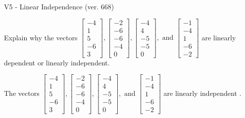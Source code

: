 \begin{exercise}
  \begin{exerciseTitle}V5 - Linear Independence (ver. 668)\end{exerciseTitle}
  \begin{exerciseStatement}
    Explain why the vectors \(\left[\begin{array}{r}
-4 \\
1 \\
5 \\
-6 \\
3
\end{array}\right] , \left[\begin{array}{r}
-2 \\
-6 \\
-6 \\
-4 \\
0
\end{array}\right] , \left[\begin{array}{r}
-4 \\
4 \\
-5 \\
-5 \\
0
\end{array}\right] , \text{ and } \left[\begin{array}{r}
-1 \\
-4 \\
1 \\
-6 \\
-2
\end{array}\right]\) are linearly dependent or linearly independent.	


  \end{exerciseStatement}
  \begin{exerciseAnswer}
   The vectors \(\left[\begin{array}{r}
-4 \\
1 \\
5 \\
-6 \\
3
\end{array}\right] , \left[\begin{array}{r}
-2 \\
-6 \\
-6 \\
-4 \\
0
\end{array}\right] , \left[\begin{array}{r}
-4 \\
4 \\
-5 \\
-5 \\
0
\end{array}\right] , \text{ and } \left[\begin{array}{r}
-1 \\
-4 \\
1 \\
-6 \\
-2
\end{array}\right]\) are 
  	 linearly independent  .
  


  \end{exerciseAnswer}
\end{exercise}
